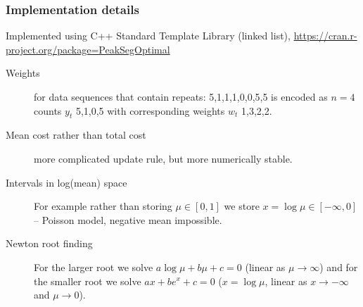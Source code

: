 \documentclass{beamer}
\begin{document}



\begin{frame}
  \frametitle{Implementation details}
  Implemented using C++ Standard Template Library (linked list),
  \url{https://cran.r-project.org/package=PeakSegOptimal}
\begin{description}
\item[Weights] for data sequences that contain repeats:
  5,1,1,1,0,0,5,5 is encoded as $n=4$ counts $y_t$ 5,1,0,5 with
  corresponding weights $w_t$ 1,3,2,2.
\item[Mean cost rather than total cost] more complicated update rule,
  but more numerically stable.
\item[Intervals in log(mean) space] For example rather than storing
  $\mu\in[0,1]$ we store $x=\log\mu\in[-\infty, 0]$ -- Poisson model,
  negative mean impossible.
\item[Newton root finding] For the larger root we solve
  $a\log\mu + b\mu + c = 0$ (linear as $\mu\rightarrow\infty$) and for
  the smaller root we solve $a x + be^x + c = 0$ ($x=\log \mu$, linear
  as $x\rightarrow -\infty$ and $\mu\rightarrow 0$). 
\end{description}
  
\end{frame}
\end{document}
